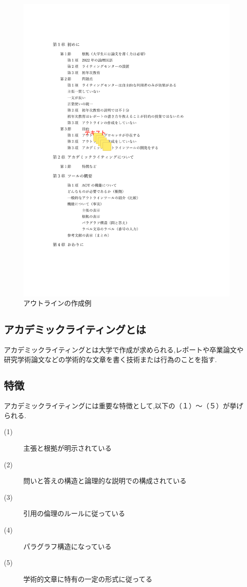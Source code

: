 \documentclass[a4j,12pt]{jarticle}
\begin{document}
\begin{figure}[h]
\begin{center}
 \includegraphics[scale=0.3]{outline.pdf}
\end{center}
 \caption{アウトラインの作成例}
 \label{fig:a}
\end{figure}
\newpage

\subsection{アカデミックライティングとは}
アカデミックライティングとは大学で作成が求められる,レポートや卒業論文や研究学術論文などの学術的な文章を書く技術または行為のことを指す\cite{ren2}.
\subsection{特徴}
アカデミックライティングには重要な特徴として,以下の（１）〜（５）が挙げられる.
\begin{description}
  \item[(1)] 主張と根拠が明示されている
  \item[(2)] 問いと答えの構造と論理的な説明での構成されている
  \item[(3)] 引用の倫理のルールに従っている
  \item[(4)] パラグラフ構造になっている
  \item[(5)] 学術的文章に特有の一定の形式に従ってる
 \end{description}
\end{document}

